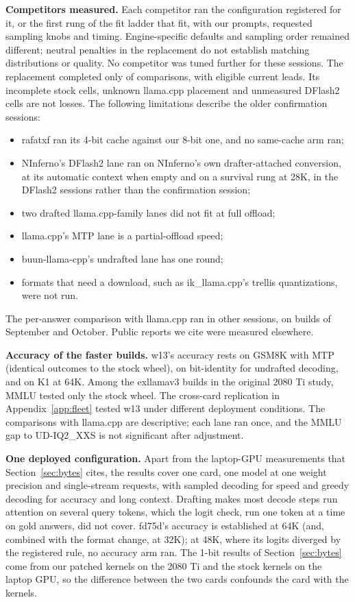 \documentclass[11pt,letterpaper]{article}
\begin{document}
\textbf{Competitors measured.} Each competitor ran the configuration
registered for it, or the first rung of the fit ladder that fit, with our
prompts, requested sampling knobs and timing. Engine-specific defaults and
sampling order remained different; neutral penalties in the replacement do
not establish matching distributions or quality. No competitor was tuned
further for these sessions. The replacement completed only
\PeFreshComplete{} of \PeFreshPlanned{} comparisons, with
\PeFreshEligible{} eligible current leads. Its incomplete stock cells,
unknown llama.cpp placement and unmeasured DFlash2 cells are not losses.
The following limitations describe the older confirmation sessions:
\begin{itemize}\setlength{\itemsep}{1pt}
\item rafatxf ran its 4-bit cache against our 8-bit one, and no same-cache arm
ran;
\item NInferno's DFlash2 lane ran on NInferno's own drafter-attached
conversion, at its automatic context when empty and on a survival rung at
28K, in the DFlash2 sessions rather than the confirmation session;
\item two drafted llama.cpp-family lanes did not fit at full offload;
\item llama.cpp's MTP lane is a partial-offload speed;
\item buun-llama-cpp's undrafted lane has one round;
\item formats that need a download, such as ik\_llama.cpp's trellis
quantizations, were not run.
\end{itemize}
The per-answer comparison with llama.cpp ran in other sessions, on builds of
September and October. Public reports we cite were measured elsewhere.

\textbf{Accuracy of the faster builds.} w13's accuracy rests on GSM8K with
MTP (identical outcomes to the stock wheel), on bit-identity for undrafted
decoding, and on K1 at 64K. Among the exllamav3 builds in the original 2080 Ti study, MMLU tested only the stock wheel. The cross-card replication in Appendix~\ref{app:fleet} tested w13 under different deployment conditions. The comparisons
with llama.cpp are descriptive; each lane ran once, and the MMLU gap to
UD-IQ2\_XXS is not significant after adjustment.

\textbf{One deployed configuration.} Apart from the laptop-GPU measurements
that Section~\ref{sec:bytes} cites, the results cover one card, one model at
one weight precision and single-stream requests, with sampled decoding for
speed and greedy decoding for accuracy and long context. Drafting
makes most decode steps run attention on several query tokens, which the
logit check, run one token at a time on gold answers, did not cover. fd75d's
accuracy is established at 64K (and, combined with the format change, at
32K); at 48K, where its logits diverged by the registered rule, no accuracy arm
ran. The 1-bit results of Section~\ref{sec:bytes} come from our patched
kernels on the 2080 Ti and the stock kernels on the laptop GPU, so the
difference between the two cards confounds the card with the kernels.
\end{document}
